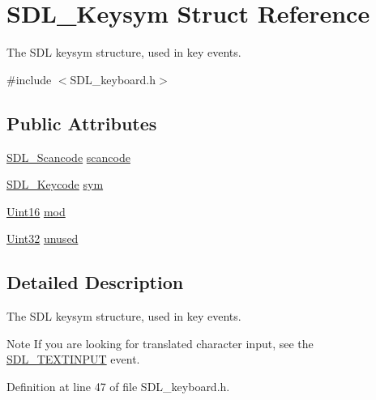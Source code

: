 \hypertarget{struct_s_d_l___keysym}{}\section{S\+D\+L\+\_\+\+Keysym Struct Reference}
\label{struct_s_d_l___keysym}


The S\+DL keysym structure, used in key events.  




{\ttfamily \#include $<$S\+D\+L\+\_\+keyboard.\+h$>$}

\subsection*{Public Attributes}
\begin{DoxyCompactItemize}
\item 
\mbox{\hyperlink{_s_d_l__scancode_8h_a82ab7cff701034fb40a47b5b3a02777b}{S\+D\+L\+\_\+\+Scancode}} \mbox{\hyperlink{struct_s_d_l___keysym_ad47e9120a511e2efc7ec0c6d8a5ec51e}{scancode}}
\item 
\mbox{\hyperlink{_s_d_l__keycode_8h_ae9265f064f13f0f74dfca26a67875171}{S\+D\+L\+\_\+\+Keycode}} \mbox{\hyperlink{struct_s_d_l___keysym_a082ff1fd787b79fa6c3a445deb225f08}{sym}}
\item 
\mbox{\hyperlink{_s_d_l__stdinc_8h_a31fcc0a076c9068668173ee26d33e42b}{Uint16}} \mbox{\hyperlink{struct_s_d_l___keysym_ab519d1b8a9939d3d035f7103f3208291}{mod}}
\item 
\mbox{\hyperlink{_s_d_l__stdinc_8h_add440eff171ea5f55cb00c4a9ab8672d}{Uint32}} \mbox{\hyperlink{struct_s_d_l___keysym_ab1d0a50cc619966fb06b92e15cc46dd9}{unused}}
\end{DoxyCompactItemize}


\subsection{Detailed Description}
The S\+DL keysym structure, used in key events. 

\begin{DoxyNote}{Note}
If you are looking for translated character input, see the \mbox{\hyperlink{_s_d_l__events_8h_a3b589e89be6b35c02e0dd34a55f3fccaa4fa2570088f6b9cbd109ae91b511368f}{S\+D\+L\+\_\+\+T\+E\+X\+T\+I\+N\+P\+UT}} event. 
\end{DoxyNote}


Definition at line 47 of file S\+D\+L\+\_\+keyboard.\+h.



